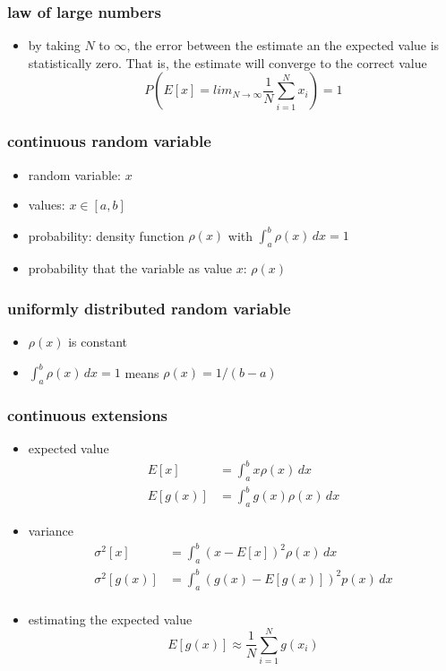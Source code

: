 \documentclass[10pt]{beamer}
\begin{document}
\begin{frame}
\frametitle{law of large numbers}
\begin{itemize}
  \item by taking $N$ to $\infty$, the error between the estimate an the
expected value is statistically zero.  That is, the estimate will
converge to the correct value
\begin{equation*} 
  P\left(E[x] = lim_{N\rightarrow\infty} \frac{1}{N} \sum_{i=1}^{N} x_i\right) = 1
\end{equation*}
\end{itemize}
\end{frame}
\begin{frame}
\frametitle{continuous random variable}
\begin{itemize}
  \item random variable: $x$
  \item values: $x\in [a,b]$
  \item probability: density function $\rho(x)$ with $\int_a^b
\rho(x)\,dx = 1$
  \item probability that the variable as value $x$: $\rho(x)$
\end{itemize}
\end{frame}
\begin{frame}
\frametitle{uniformly distributed random variable}
\begin{itemize}
  \item $\rho(x)$ is constant
  \item $\int_a^b \rho(x)\,dx = 1$ means $\rho(x) = 1/(b-a)$
\end{itemize}
\end{frame}
\begin{frame}
\frametitle{continuous extensions}
\begin{itemize}
  \item expected value
  \begin{align*}
  E[x] & = \int_a^b x\rho(x)\,dx\\
  E[g(x)] & = \int_a^b g(x)\rho(x)\,dx
  \end{align*}
  \item variance
  \begin{align*}
  \sigma^2[x] & = \int_a^b (x-E[x])^2\rho(x)\,dx\\
  \sigma^2[g(x)] & = \int_a^b (g(x)-E[g(x)])^2 p(x)\,dx\\
  \end{align*}
  \item estimating the expected value
  \begin{equation*}
    E[g(x)] \approx \frac{1}{N} \sum_{i=1}^{N} g(x_i)
\end{equation*}
\end{itemize}
\end{frame}
\end{document}
